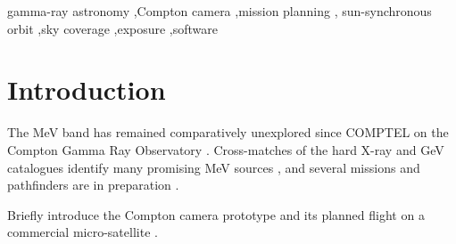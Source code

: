 \documentclass[a4paper,fleqn]{cas-sc}
\newif\ifshowtodos
\newcommand{\todo}[1]{\ifshowtodos{\color{red!70!black}\textbf{[TODO:} #1\textbf{]}}\fi}
\begin{document}

\begin{abstract}
\todo{Write last, 150--250 words.} Suggested outline:
(1) context: MeV gamma-ray astronomy and the planned Compton camera on a
commercial micro-satellite;
(2) the need for planning tools: orbit, eclipse, SAA, sky coverage and source
visibility for a wide-field, non-steered instrument;
(3) what we present: Python scripts for the ground track and the celestial
track, and a self-contained browser application with zenith, Sun-tracking and
fixed-target pointing, including Earth occultation;
(4) the model: circular orbit with $J_2$ secular terms in a
\SI{525}{km}, \SI{97.5}{\degree}, LTDN 10:30 sun-synchronous orbit;
(5) key results, e.g.\ the seasonal visibility of the Crab, the time in view of
the 20 COMPTEL-era sources, and validation against analytic expectations;
(6) availability: open source at
\url{https://github.com/Eclipsedclaw/compton_satellite_sim}.
\end{abstract}

\begin{keywords}
gamma-ray astronomy \sep Compton camera \sep mission planning \sep
sun-synchronous orbit \sep sky coverage \sep exposure \sep software
\end{keywords}

\maketitle

\section{Introduction}
\label{sec:intro}

\todo{Motivation.} The MeV band has remained comparatively unexplored since
COMPTEL on the Compton Gamma Ray Observatory \cite{Schoenfelder1993,
Schoenfelder2000}. Cross-matches of the hard X-ray and GeV catalogues identify
many promising MeV sources \cite{Tsuji2021}, and several missions and
pathfinders are in preparation \citep[e.g.][]{Tomsick2019}.

\todo{Our instrument.} Briefly introduce the Compton camera prototype and its
planned flight on a commercial micro-satellite \cite{CameraPaper}.
\end{document}
